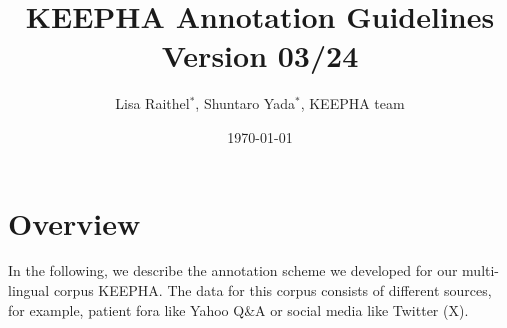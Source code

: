 \documentclass[12pt]{article}
\title{KEEPHA Annotation Guidelines\\ Version 03/24}
\author{Lisa Raithel$^\ast$, Shuntaro Yada$^\ast$, KEEPHA team}
\date{\today}
\theoremstyle{definition}
\begin{document}
\maketitle

\setcounter{tocdepth}{2}
\tableofcontents

\clearpage

\section{Overview}
In the following, we describe the annotation scheme we developed for our multi-lingual corpus KEEPHA.
The data for this corpus consists of different sources, for example, patient fora like Yahoo Q\&A or social media like Twitter (X).



\end{document}
